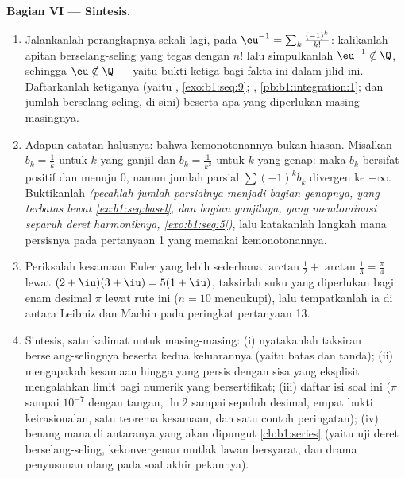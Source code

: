 \begin{problem}
\medskip
\noindent\textbf{Bagian VI --- Sintesis.}
\begin{enumerate}[resume]
  \item Jalankanlah perangkapnya sekali lagi, pada $\eu^{-1} = \sum_k
        \frac{(-1)^k}{k!}$: kalikanlah apitan berselang-seling
        yang tegas dengan $n!$ lalu simpulkanlah $\eu^{-1} \notin \Q$,
        sehingga $\eu \notin \Q$ --- yaitu bukti ketiga bagi fakta ini
        dalam jilid ini. Daftarkanlah ketiganya (yaitu ,
        \cref{exo:b1:seq:9}; ,
        \cref{pb:b1:integration:1}; dan jumlah berselang-seling, di sini) beserta
        apa yang diperlukan masing-masingnya.
  \item Adapun catatan halusnya: bahwa kemonotonannya bukan hiasan. Misalkan
        $b_k = \frac1k$ untuk $k$ yang ganjil dan $b_k = \frac{1}{k^2}$
        untuk $k$ yang genap: maka $b_k$ bersifat positif dan menuju $0$,
        namun jumlah parsial $\sum (-1)^k b_k$ divergen ke
        $-\infty$. Buktikanlah \emph{(pecahlah jumlah parsialnya menjadi
        bagian genapnya, yang terbatas lewat
        \cref{ex:b1:seq:basel}, dan bagian ganjilnya, yang
        mendominasi separuh deret harmoniknya,
        \cref{exo:b1:seq:5})}, lalu katakanlah langkah mana persisnya pada
        pertanyaan 1 yang memakai kemonotonannya.
  \item Periksalah kesamaan Euler yang lebih sederhana $\arctan\frac12 +
        \arctan\frac13 = \frac\pi4$ lewat $(2 + \iu)(3 + \iu) =
        5(1 + \iu)$, taksirlah suku yang diperlukan bagi enam desimal
        $\pi$ lewat rute ini ($n = 10$ mencukupi), lalu tempatkanlah ia
        di antara Leibniz dan Machin pada peringkat pertanyaan
        13.
  \item Sintesis, satu kalimat untuk masing-masing: (i) nyatakanlah taksiran
        berselang-selingnya beserta kedua keluarannya (yaitu batas dan tanda); (ii) mengapakah
        kesamaan hingga yang persis dengan sisa yang eksplisit mengalahkan
         limit bagi numerik yang bersertifikat; (iii) daftar isi
        soal ini ($\pi$ sampai $10^{-7}$ dengan tangan, $\ln 2$ sampai
        sepuluh desimal, empat bukti keirasionalan, satu teorema
        kesamaan, dan satu contoh peringatan); (iv) benang mana di antaranya
        yang akan dipungut \cref{ch:b1:series} (yaitu uji deret
        berselang-seling, kekonvergenan mutlak lawan bersyarat,
        dan drama penyusunan ulang pada soal akhir pekannya).

\end{enumerate}
\end{problem}
